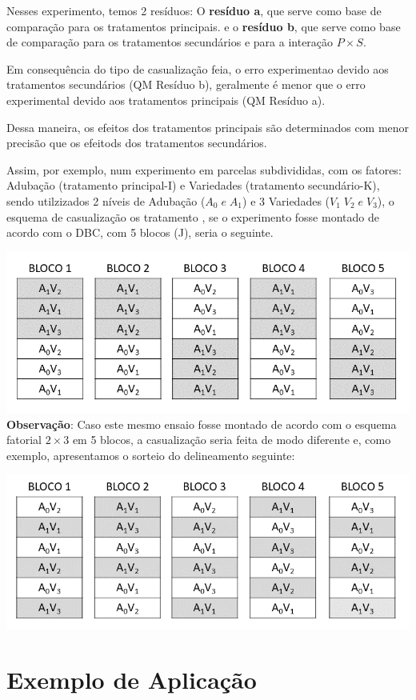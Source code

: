 \documentclass[
]{book}
\begin{document}
Nesses experimento, temos 2 resíduos: O \textbf{resíduo a}, que serve como base de comparação para os tratamentos principais. e o \textbf{resíduo b}, que serve como base de comparação para os tratamentos secundários e para a interação \(P \times S\).

Em consequência do tipo de casualização feia, o erro experimentao devido aos tratamentos secundários (QM Resíduo b), geralmente é menor que o erro experimental devido aos tratamentos principais (QM Resíduo a).

Dessa maneira, os efeitos dos tratamentos principais são determinados com menor precisão que os efeitods dos tratamentos secundários.

Assim, por exemplo, num experimento em parcelas subdivididas, com os fatores: Adubação (tratamento principal-I) e Variedades (tratamento secundário-K), sendo utilzizados 2 níveis de Adubação (\(A_0\; e\; A_1\)) e 3 Variedades (\(V_1\;V_2\;e\; V_3\)), o esquema de casualização os tratamento , se o experimento fosse montado de acordo com o DBC, com 5 blocos (J), seria o seguinte.

\includegraphics{psub1.png}
\textbf{Observação}: Caso este mesmo ensaio fosse montado de acordo com o esquema fatorial \(2 \times 3\) em 5 blocos, a casualização seria feita de modo diferente e, como exemplo, apresentamos o sorteio do delineamento seguinte:

\includegraphics{fat1.png}

\hypertarget{exemplo-de-aplicauxe7uxe3o-2}{%
\section{Exemplo de Aplicação}\label{exemplo-de-aplicauxe7uxe3o-2}}
\end{document}
